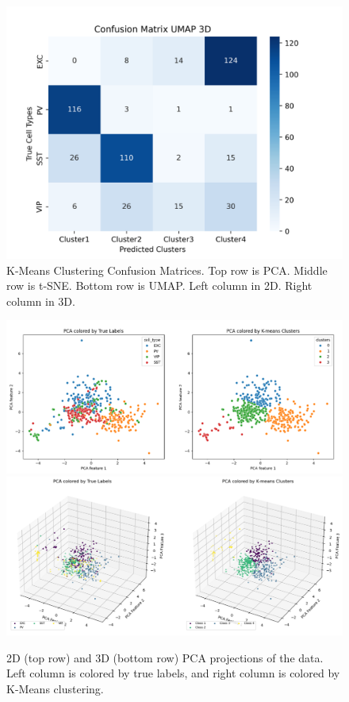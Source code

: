 \documentclass{IEEEtran}
\begin{document}
\begin{figure}[h!]
  \includegraphics[width=0.45\columnwidth]{figures/Confusion Matrix UMAP 3D.png}
  \caption{K-Means Clustering Confusion Matrices. Top row is PCA. Middle row is t-SNE. Bottom row is UMAP. Left column in 2D. Right column in 3D.}%
  \label{fig:unsupervised_confusion_matrices}
\end{figure}

\begin{figure}[h!]
  \centering
  \includegraphics[width=1\columnwidth]{figures/Compare PCA 2D.png}
  \includegraphics[width=1\columnwidth]{figures/Compare PCA 3D.png}
  \caption{2D (top row) and 3D (bottom row) PCA projections of the data. Left column is colored by true labels, and right column is colored by K-Means clustering.}%
  \label{fig:pca}
\end{figure}
\end{document}

